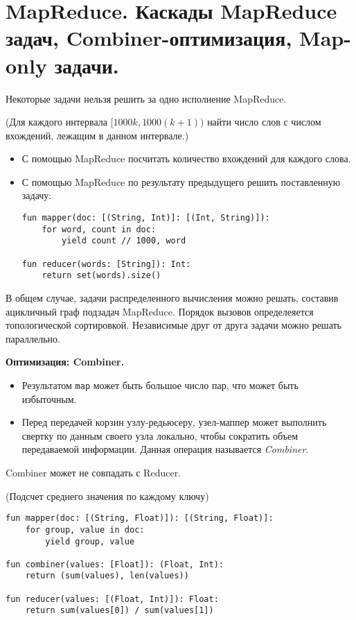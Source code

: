 \section{MapReduce. Каскады MapReduce задач, Combiner-оптимизация, Map-only
  задачи.}

Некоторые задачи нельзя решить за одно исполнение MapReduce.


\begin{example}(Для каждого интервала $[1000k, 1000(k + 1))$ найти число слов с
  числом вхождений, лежащим в данном интервале.)
  \begin{itemize}
    \item С помощью MapReduce посчитать количество вхождений для каждого слова.
    \item С помощью MapReduce по результату предыдущего решить поставленную
      задачу:
      \begin{lstlisting}
fun mapper(doc: [(String, Int)]: [(Int, String)]):
    for word, count in doc:
        yield count // 1000, word

fun reducer(words: [String]): Int:
    return set(words).size()
      \end{lstlisting}
  \end{itemize}
\end{example}

\begin{proposition}
  В общем случае, задачи распределенного вычисления можно решать, составив
  ацикличный граф подзадач MapReduce. Порядок вызовов определеяется
  топологической сортировкой. Независимые друг от друга задачи можно решать
  параллельно.
\end{proposition}

\textbf{Оптимизация: Combiner.}
\begin{itemize}
  \item Результатом \texttt{map} может быть большое число пар, что может быть
    избыточным.
  \item Перед передачей корзин узлу-редьюсеру, узел-маппер может выполнить
    свертку по данным своего узла локально, чтобы сократить объем передаваемой
    информации. Данная операция называется \textit{Combiner}.
\end{itemize}

\begin{remark} Combiner может не совпадать с Reducer.
\end{remark}

\begin{example}(Подсчет среднего значения по каждому ключу)
  \begin{lstlisting}
fun mapper(doc: [(String, Float)]): [(String, Float)]:
    for group, value in doc:
        yield group, value

fun combiner(values: [Float]): (Float, Int):
    return (sum(values), len(values))

fun reducer(values: [(Float, Int)]): Float:
    return sum(values[0]) / sum(values[1])
  \end{lstlisting}
\end{example}
